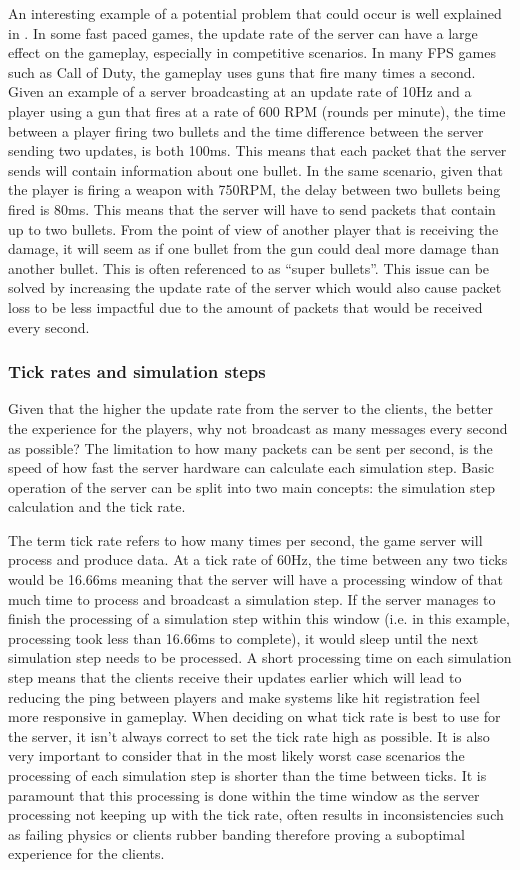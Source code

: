 An interesting example of a potential problem that could occur is well explained in . In some fast paced games, the update rate of the server can have a large effect on the gameplay, especially in competitive scenarios. In many FPS games such as Call of Duty, the gameplay uses guns that fire many times a second. Given an example of a server broadcasting at an update rate of 10Hz and a player using a gun that fires at a rate of 600 RPM (rounds per minute), the time between a player firing two bullets and the time difference between the server sending two updates, is both 100ms. This means that each packet that the server sends will contain information about one bullet. In the same scenario, given that the player is firing a weapon with 750RPM, the delay between two bullets being fired is 80ms. This means that the server will have to send packets that contain up to two bullets. From the point of view of another player that is receiving the damage, it will seem as if one bullet from the gun could deal more damage than another bullet. This is often referenced to as ``super bullets''. This issue can be solved by increasing the update rate of the server which would also cause packet loss to be less impactful due to the amount of packets that would be received every second.


\subsubsection{Tick rates and simulation steps}
Given that the higher the update rate from the server to the clients, the better the experience for the players, why not broadcast as many messages every second as possible? The limitation to how many packets can be sent per second, is the speed of how fast the server hardware can calculate each simulation step. Basic operation of the server can be split into two main concepts: the simulation step calculation and the tick rate.

The term tick rate refers to how many times per second, the game server will process and produce data. At a tick rate of 60Hz, the time between any two ticks would be 16.66ms meaning that the server will have a processing window of that much time to process and broadcast a simulation step. If the server manages to finish the processing of a simulation step within this window (i.e. in this example, processing took less than 16.66ms to complete), it would sleep until the next simulation step needs to be processed. A short processing time on each simulation step means that the clients receive their updates earlier which will lead to reducing the ping between players and make systems like hit registration feel more responsive in gameplay. When deciding on what tick rate is best to use for the server, it isn't always correct to set the tick rate high as possible. It is also very important to consider that in the most likely worst case scenarios the processing of each simulation step is shorter than the time between ticks. It is paramount that this processing is done within the time window as the server processing not keeping up with the tick rate, often results in inconsistencies such as failing physics or clients rubber banding therefore proving a suboptimal experience for the clients.

